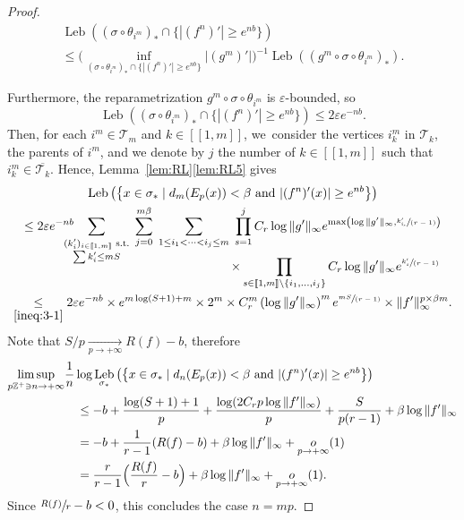 \documentclass[10pt]{amsart}
\newcommand{\spfrac}[2]{\sfrac{#1}{(#2)}}
\DeclareMathOperator{\Leb}{Leb}
\theoremstyle{definition}
\newcommand{\bbZ}{{\mathbb{Z}}}
\begin{document}
\begin{proof}
\begin{minipage}{\textwidth}
\begin{multline*}
\Leb ((\sigma \circ \theta_{i^m})_* \cap \{ |(f^n)'| \geq e^{nb} \})\\
\leq \biggl (\inf_{(\sigma \circ \theta_{i^m})_* \cap \{ |(f^n)'| \geq e^{nb} \}} |(g^m)'|\biggr)^{-1} \Leb ((g^m \circ \sigma \circ \theta_{i^m})_*).
\end{multline*}
\end{minipage}
\par\smallskip\noindent
Furthermore, the reparametrization $g^m \circ \sigma \circ \theta_{i^m}$ is $\varepsilon$-bounded, so
\[
\Leb ((\sigma \circ \theta_{i^m})_* \cap \{ |(f^n)'| \geq e^{nb} \}) \leq 2 \varepsilon e^{-nb}.
\]
Then, for each $i^m \in \mathcal{T}_m$ and $k \in [\![ 1, m ]\!]$, we~consider the vertices $i^m_k$ in $\mathcal{T}_k$, \ie the parents of $i^m$, and we denote by $j$ the number of $k \in [\![ 1, m ]\!]$ such that $i_k^m \in \overline{\mathcal{T}_k}$. Hence,  Lemma~\ref{lem:RL}\eqref{lem:RL5} gives
\begin{multline*}
\Leb\left (\left \{ x \in \sigma_* \mid d_m(E_p(x)) < \beta \text{ and } | (f^n)'(x) | \geq e^{nb}\right \} \right)\\
\leq 2 \varepsilon e^{- nb} \hspace{-1em}\sum_{\substack{(k_i')_{i \in [\![ 1, m ]\!]} \text{ s.t.}\\
\sum k_i' \leq m S}} \; \sum_{j = 0}^{m \beta} \; \sum_{1 \leq i_1 < \cdots < i_j \leq m}\; \prod_{s=1}^j C_r \log \| g' \|_{\infty} e^{\max \left (\log \| g' \|_{\infty}, \spfrac{k_{i_s}'}{r-1} \right)}\\[-1em]
\shoveright{\times \prod_{s \in [\![ 1, m ]\!] \setminus \{ i_1,\dots, i_j \}} C_r \log \| g' \|_{\infty} e^{\spfrac{k_s'}{r-1}}}\\
\underset{\eqref{ineq:3-1}}{\leq} 2 \varepsilon e^{-nb} \times e^{m \log (S + 1) + m} \times 2^m \times C_r^m \left (\log \| g' \|_{\infty} \right)^m e^{\spfrac{m S}{r-1}} \times \| f' \|_{\infty}^{p \times \beta m}.
\end{multline*}
Note that $S/p \underset{p \to +\infty}{\longrightarrow} R(f) - b$, therefore
\begin{align*}
\limsup_{p \bbZ^+ \ni n \to +\infty} &\frac{1}{n} \log \Leb_{\sigma_*} \left (\left \{ x \in \sigma_* \mid d_n(E_p(x)) < \beta \text{ and } | (f^n)'(x) | \geq e^{nb} \right \} \right)\\
&\hspace{1em}\leq -b + \frac{\log(S+1) + 1}{p} + \frac{\log (2 C_r p \log \| f ' \|_{\infty})}{p}
+ \frac{S}{p(r-1)} + \beta \log \| f' \|_{\infty}\\
&\hspace{1em}= -b + \frac{1}{r-1}(R(f) - b) + \beta \log \| f' \|_{\infty} + \underset{p \to +\infty}{o}(1)\\
&\hspace{1em}=\frac{r}{r-1}\Bigl (\frac{R(f)}{r} - b \Bigr) + \beta \log \| f' \|_{\infty} + \underset{p \to +\infty}{o}(1).
\end{align*}
Since $\sfrac{R(f)}{r} - b < 0$, this concludes the case $n=mp$.


\end{proof}
\end{document}
